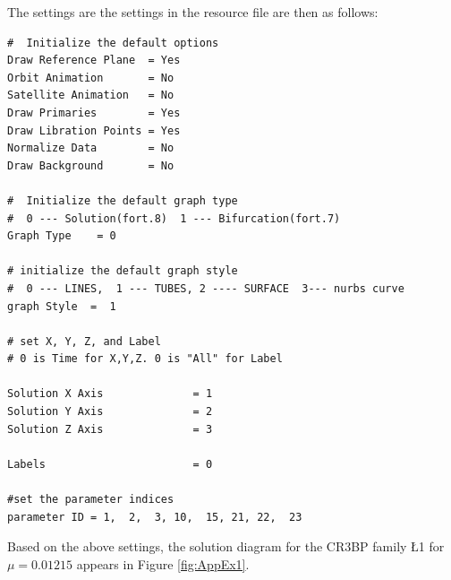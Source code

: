 The settings are the settings in the resource file are then as follows:
{\footnotesize
\begin{verbatim}
#  Initialize the default options
Draw Reference Plane  = Yes
Orbit Animation       = No
Satellite Animation   = No 
Draw Primaries        = Yes
Draw Libration Points = Yes
Normalize Data        = No
Draw Background       = No

#  Initialize the default graph type
#  0 --- Solution(fort.8)  1 --- Bifurcation(fort.7)
Graph Type    = 0

# initialize the default graph style
#  0 --- LINES,  1 --- TUBES, 2 ---- SURFACE  3--- nurbs curve
graph Style  =  1

# set X, Y, Z, and Label
# 0 is Time for X,Y,Z. 0 is "All" for Label

Solution X Axis              = 1
Solution Y Axis              = 2
Solution Z Axis              = 3

Labels                       = 0

#set the parameter indices 
parameter ID = 1,  2,  3, 10,  15, 21, 22,  23
\end{verbatim}
}

Based on the above settings, 
the solution diagram for the CR3BP family \L{1} for $\mu=0.01215$ appears in Figure \ref{fig:AppEx1}.

